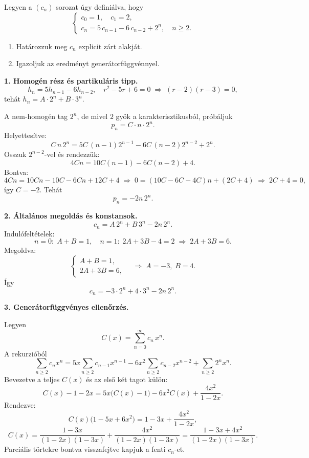 \begin{extraproblem}
Legyen a $(c_{n})$ sorozat úgy definiálva, hogy 
\[
\begin{cases}
c_{0}=1,\quad c_{1}=2,\\
c_{n}=5\,c_{n-1}-6\,c_{n-2}+2^{n},\quad n\ge2.
\end{cases}
\]
\begin{enumerate}
\item Határozzuk meg $c_{n}$ explicit zárt alakját. 
\item Igazoljuk az eredményt generátorfüggvénnyel. 
\end{enumerate}
\end{extraproblem}

\vspace{1em}

\begin{solution}
\textbf{1. Homogén rész és partikuláris tipp.} 
\[
h_{n}=5h_{n-1}-6h_{n-2},\quad r^{2}-5r+6=0\;\Rightarrow\;(r-2)(r-3)=0,
\]
tehát $h_{n}=A\cdot2^{n}+B\cdot3^{n}$.

A nem‐homogén tag $2^{n}$, de mivel $2$ gyök a karakterisztikusból,
próbáljuk 
\[
p_{n}=C\cdot n\cdot2^{n}.
\]
Helyettesítve: 
\[
C\,n\,2^{n}=5C\,(n-1)2^{n-1}-6C\,(n-2)2^{n-2}+2^{n}.
\]
Osszuk $2^{n-2}$-vel és rendezzük: 
\[
4Cn=10C(n-1)-6C(n-2)+4.
\]
Bontva: 
\[
4Cn=10Cn-10C-6Cn+12C+4\;\Longrightarrow\;0=(10C-6C-4C)n+(2C+4)\;\Longrightarrow\;2C+4=0,
\]
így $C=-2$. Tehát 
\[
p_{n}=-2n\,2^{n}.
\]

\textbf{2. Általános megoldás és konstansok.} 
\[
c_{n}=A\,2^{n}+B\,3^{n}-2n\,2^{n}.
\]
Indulófeltételek: 
\[
n=0:\;A+B=1,\quad n=1:\;2A+3B-4=2\;\Longrightarrow\;2A+3B=6.
\]
Megoldva: 
\[
\begin{cases}
A+B=1,\\
2A+3B=6,
\end{cases}\quad\Longrightarrow\;A=-3,\;B=4.
\]
Így 
\[
\boxed{c_{n}=-3\cdot2^{n}+4\cdot3^{n}-2n\,2^{n}.}
\]

\textbf{3. Generátorfüggvényes ellenőrzés.}

Legyen 
\[
C(x)=\sum_{n=0}^{\infty}c_{n}\,x^{n}.
\]
A rekurzióból 
\[
\sum_{n\ge2}c_{n}x^{n}=5x\sum_{n\ge2}c_{n-1}x^{n-1}-6x^{2}\sum_{n\ge2}c_{n-2}x^{n-2}+\sum_{n\ge2}2^{n}x^{n}.
\]
Bevezetve a teljes $C(x)$ és az első két tagot külön: 
\[
C(x)-1-2x=5x\bigl(C(x)-1\bigr)-6x^{2}C(x)+\frac{4x^{2}}{1-2x}.
\]
Rendezve: 
\[
C(x)\bigl(1-5x+6x^{2}\bigr)=1-3x+\frac{4x^{2}}{1-2x},
\]
\[
C(x)=\frac{1-3x}{(1-2x)(1-3x)}+\frac{4x^{2}}{(1-2x)(1-3x)}=\frac{1-3x+4x^{2}}{(1-2x)(1-3x)}.
\]
Parciális törtekre bontva visszafejtve kapjuk a fenti $c_{n}$-et.
\end{solution}
\vspace{1em}

